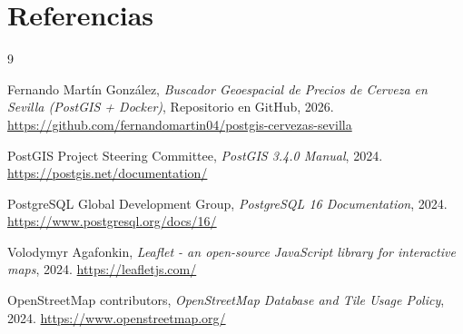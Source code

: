 \documentclass[a4paper,12pt]{article}
\begin{document}
\section{Referencias}

\begin{thebibliography}{9}

Fernando Martín González,
\textit{Buscador Geoespacial de Precios de Cerveza en Sevilla (PostGIS + Docker)},
Repositorio en GitHub, 2026.
\url{https://github.com/fernandomartin04/postgis-cervezas-sevilla}

PostGIS Project Steering Committee,
\textit{PostGIS 3.4.0 Manual},
2024.
\url{https://postgis.net/documentation/}

PostgreSQL Global Development Group,
\textit{PostgreSQL 16 Documentation},
2024.
\url{https://www.postgresql.org/docs/16/}

Volodymyr Agafonkin,
\textit{Leaflet - an open-source JavaScript library for interactive maps},
2024.
\url{https://leafletjs.com/}

OpenStreetMap contributors,
\textit{OpenStreetMap Database and Tile Usage Policy},
2024.
\url{https://www.openstreetmap.org/}

\end{thebibliography}
\end{document}
